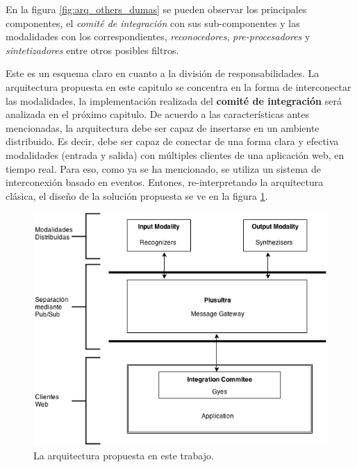 En la figura \ref{fig:arq_others_dumas} se pueden observar los principales componentes, el \emph{comité de integración} con sus sub-componentes y las modalidades con los correspondientes, \emph{reconocedores}, \emph{pre-procesadores} y \emph{sintetizadores} entre otros posibles filtros.

Este es un esquema claro en cuanto a la división de responsabilidades. La arquitectura propuesta en este capitulo se concentra en la forma de interconectar las modalidades, la implementación realizada del \textbf{comité de integración} será analizada en el próximo capitulo.
De acuerdo a las características antes mencionadas, la arquitectura debe ser capaz de insertarse en un ambiente distribuido. Es decir, debe ser capaz de conectar de una forma clara y efectiva modalidades (entrada y salida) con múltiples clientes de una aplicación web, en tiempo real. Para eso, como ya se ha mencionado, se utiliza un sistema de interconexión basado en eventos. Entones, re-interpretando la arquitectura clásica, el diseño de la solución propuesta se ve en la figura \ref{fig:arq_dumas_plusultra}.

\begin{center}
  \begin{figure}[h]
    \includegraphics[scale=1,width=\textwidth]{gfx/Dumas_Plusultra}
    \caption{La arquitectura propuesta en este trabajo.}
    \label{fig:arq_dumas_plusultra}
  \end{figure}
\end{center}

